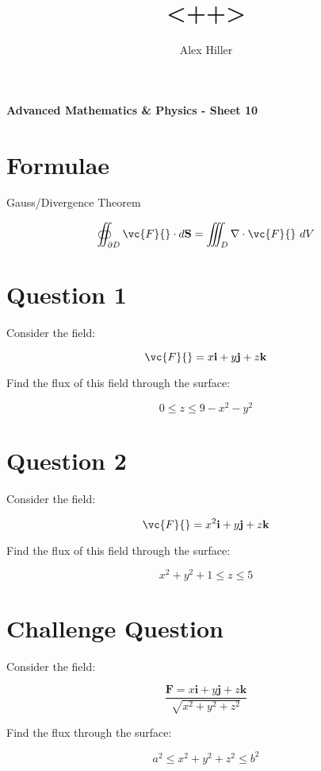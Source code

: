 \documentclass{article}
\author{Alex Hiller}
\title{<++>}
\begin{document}

\begin{huge} \textbf{Advanced Mathematics & Physics - Sheet 10} \end{huge}

\section{Formulae}

Gauss/Divergence Theorem

\begin{equation}
  \oiint_{\partial D} \vc{F}{} \cdot d \mathbf{S}
  = \iiint_{D} \nabla \cdot \vc{F}{} \ dV
\end{equation}


\section{Question 1}

Consider the field:

\begin{equation}
  \vc{F}{} = x \mathbf{i} + y \mathbf{j} + z \mathbf{k}
\end{equation}

Find the flux of this field through the surface:

\begin{equation}
  0 \leq z \leq 9 - x^2 - y^2
\end{equation}

\section{Question 2}

Consider the field:

\begin{equation}
  \vc{F}{} = x^2 \mathbf{i} +  y \mathbf{j} + z \mathbf{k}
\end{equation}

Find the flux of this field through the surface:

\begin{equation}
  x^2 + y^2 + 1 \leq z \leq 5
\end{equation}

\section{Challenge Question}

Consider the field:

\begin{equation}
  \frac{\mathbf{F} = x \mathbf{i} + y \mathbf{j} + z \mathbf{k}}
  {\sqrt{x^2 + y^2 + z^2}}
\end{equation}

Find the flux through the surface:

\begin{equation}
  a^2 \leq x^2 + y^2 + z^2 \leq b^2
\end{equation}  
\end{document}
